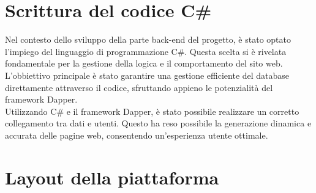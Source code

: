 \section{Scrittura del codice C\#}\label{sec:cap_sec_subsec}
Nel contesto dello sviluppo della parte back-end del progetto, è stato optato l'impiego del linguaggio di programmazione C\#. 
Questa scelta si è rivelata fondamentale per la gestione della logica e il comportamento del sito web. 
L'obbiettivo principale è stato garantire una gestione efficiente del database direttamente attraverso il codice, 
sfruttando appieno le potenzialità del framework Dapper.
\\
Utilizzando C\# e il framework Dapper, è stato possibile realizzare un corretto collegamento tra dati e utenti. 
Questo ha reso possibile la generazione dinamica e accurata delle pagine web, consentendo un'esperienza utente ottimale.


\section{Layout della piattaforma}\label{sec:cap_sec_subsec}
